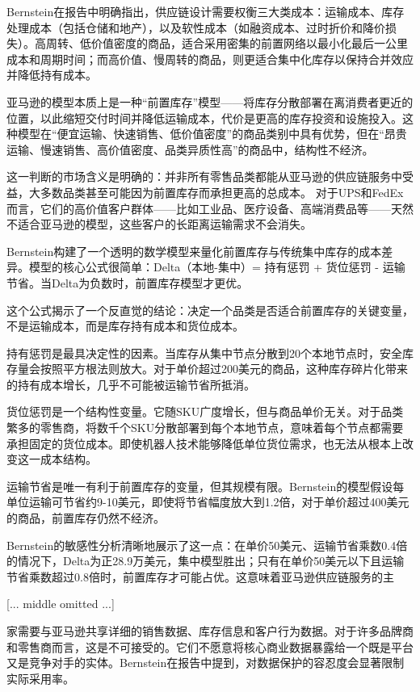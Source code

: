 \documentclass[11pt]{ctexart}
\begin{document}
Bernstein在报告中明确指出，供应链设计需要权衡三大类成本：运输成本、库存处理成本（包括仓储和地产），以及软性成本（如融资成本、过时折价和降价损失）。高周转、低价值密度的商品，适合采用密集的前置网络以最小化最后一公里成本和周期时间；而高价值、慢周转的商品，则更适合集中化库存以保持合并效应并降低持有成本。

亚马逊的模型本质上是一种“前置库存”模型——将库存分散部署在离消费者更近的位置，以此缩短交付时间并降低运输成本，代价是更高的库存投资和设施投入。这种模型在“便宜运输、快速销售、低价值密度”的商品类别中具有优势，但在“昂贵运输、慢速销售、高价值密度、品类异质性高”的商品中，结构性不经济。

这一判断的市场含义是明确的：并非所有零售品类都能从亚马逊的供应链服务中受益，大多数品类甚至可能因为前置库存而承担更高的总成本。 对于UPS和FedEx而言，它们的高价值客户群体——比如工业品、医疗设备、高端消费品等——天然不适合亚马逊的模型，这些客户的长距离运输需求不会消失。

Bernstein构建了一个透明的数学模型来量化前置库存与传统集中库存的成本差异。模型的核心公式很简单：Delta（本地-集中）= 持有惩罚 + 货位惩罚 - 运输节省。当Delta为负数时，前置库存模型才更优。

这个公式揭示了一个反直觉的结论：决定一个品类是否适合前置库存的关键变量，不是运输成本，而是库存持有成本和货位成本。

持有惩罚是最具决定性的因素。当库存从集中节点分散到20个本地节点时，安全库存量会按照平方根法则放大。对于单价超过200美元的商品，这种库存碎片化带来的持有成本增长，几乎不可能被运输节省所抵消。

货位惩罚是一个结构性变量。它随SKU广度增长，但与商品单价无关。对于品类繁多的零售商，将数千个SKU分散部署到每个本地节点，意味着每个节点都需要承担固定的货位成本。即使机器人技术能够降低单位货位需求，也无法从根本上改变这一成本结构。

运输节省是唯一有利于前置库存的变量，但其规模有限。Bernstein的模型假设每单位运输可节省约9-10美元，即使将节省幅度放大到1.2倍，对于单价超过400美元的商品，前置库存仍然不经济。

Bernstein的敏感性分析清晰地展示了这一点：在单价50美元、运输节省乘数0.4倍的情况下，Delta为正28.9万美元，集中模型胜出；只有在单价50美元以下且运输节省乘数超过0.8倍时，前置库存才可能占优。这意味着亚马逊供应链服务的主

[... middle omitted ...]

家需要与亚马逊共享详细的销售数据、库存信息和客户行为数据。对于许多品牌商和零售商而言，这是不可接受的。它们不愿意将核心商业数据暴露给一个既是平台又是竞争对手的实体。Bernstein在报告中提到，对数据保护的容忍度会显著限制实际采用率。
\end{document}
